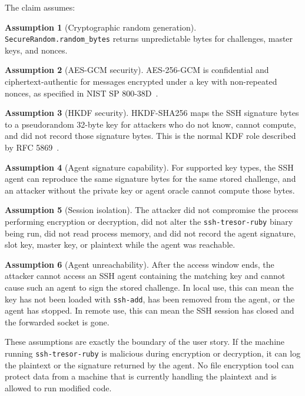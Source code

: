 \documentclass[11pt]{article}
\theoremstyle{definition}
\newtheorem{assumption}{Assumption}
\theoremstyle{plain}
\newcommand{\Project}{\texttt{ssh-tresor-ruby}}
\begin{document}
The claim assumes:

\begin{assumption}[Cryptographic random generation]
\texttt{SecureRandom.random\_bytes} returns unpredictable bytes for challenges, master keys, and nonces.
\end{assumption}

\begin{assumption}[AES-GCM security]
AES-256-GCM is confidential and ciphertext-authentic for messages encrypted under a key with non-repeated nonces, as specified in NIST SP 800-38D~\cite{nist-gcm}.
\end{assumption}

\begin{assumption}[HKDF security]
HKDF-SHA256 maps the SSH signature bytes to a pseudorandom 32-byte key for attackers who do not know, cannot compute, and did not record those signature bytes. This is the normal KDF role described by RFC 5869~\cite{rfc5869}.
\end{assumption}

\begin{assumption}[Agent signature capability]
For supported key types, the SSH agent can reproduce the same signature bytes for the same stored challenge, and an attacker without the private key or agent oracle cannot compute those bytes.
\end{assumption}

\begin{assumption}[Session isolation]
The attacker did not compromise the process performing encryption or decryption, did not alter the \Project{} binary being run, did not read process memory, and did not record the agent signature, slot key, master key, or plaintext while the agent was reachable.
\end{assumption}

\begin{assumption}[Agent unreachability]
After the access window ends, the attacker cannot access an SSH agent containing the matching key and cannot cause such an agent to sign the stored challenge. In local use, this can mean the key has not been loaded with \texttt{ssh-add}, has been removed from the agent, or the agent has stopped. In remote use, this can mean the SSH session has closed and the forwarded socket is gone.
\end{assumption}

These assumptions are exactly the boundary of the user story. If the machine running \Project{} is malicious during encryption or decryption, it can log the plaintext or the signature returned by the agent. No file encryption tool can protect data from a machine that is currently handling the plaintext and is allowed to run modified code.
\end{document}
